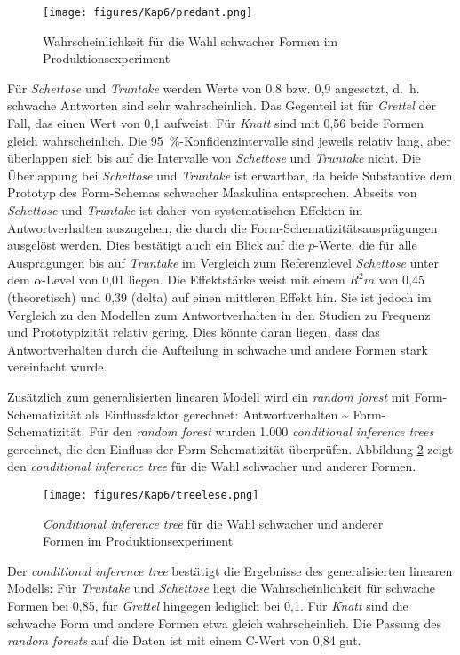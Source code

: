 \begin{figure}
\texttt{[image: figures/Kap6/predant.png]} 
\caption{Wahrscheinlichkeit für die Wahl schwacher Formen im Produktionsexperiment}
\label{predantles}
\end{figure}

Für \textit{Schettose} und \textit{Truntake} werden Werte von 0,8 bzw. 0,9 angesetzt, d.~h. schwache Antworten sind sehr wahrscheinlich. Das Gegenteil ist für \textit{Grettel} der Fall, das einen Wert von 0,1 aufweist. Für \textit{Knatt} sind mit 0,56 beide Formen gleich wahrscheinlich. Die 95~\%-Konfidenzintervalle sind jeweils relativ lang, aber überlappen sich bis auf die Intervalle von \textit{Schettose} und \textit{Truntake} nicht. Die Überlappung bei \textit{Schettose} und \textit{Truntake} ist erwartbar, da beide Substantive dem Prototyp des Form-Schemas schwacher Maskulina entsprechen. Abseits von \textit{Schettose} und \textit{Truntake} ist daher von systematischen Effekten im Antwortverhalten auszugehen, die durch die Form-Schematizitätsausprägungen ausgelöst werden. Dies bestätigt auch ein Blick auf die $p$-Werte, die für alle Ausprägungen bis auf \textit{Truntake} im Vergleich zum Referenzlevel \textit{Schettose} unter dem $\alpha$-Level von 0,01 liegen. Die Effektstärke weist mit einem $R^2m$ von 0,45 (theoretisch) und 0,39 (delta) auf einen mittleren Effekt hin. Sie ist jedoch im Vergleich zu den Modellen zum Antwortverhalten in den Studien zu Frequenz und Prototypizität relativ gering. Dies könnte daran liegen, dass das Antwortverhalten durch die Aufteilung in schwache und andere Formen stark vereinfacht wurde.

Zusätzlich zum generalisierten linearen Modell wird ein \textit{random forest} mit Form-Schemati\-zi\-tät als Einflussfaktor gerechnet: Antwortverhalten \~{} Form-Sche\-ma\-ti\-zi\-tät. Für den \textit{random forest} wurden 1.000 \textit{conditional inference trees} gerechnet, die den Einfluss der Form-Schematizität überprüfen. Abbildung \ref{treeles} zeigt den \textit{conditional inference tree} für die Wahl schwacher und anderer Formen. 

\begin{figure}
\texttt{[image: figures/Kap6/treelese.png]} 
\caption{\textit{Conditional inference tree} für die Wahl schwacher und anderer Formen im Produktionsexperiment}
\label{treeles}
\end{figure}

Der \textit{conditional inference tree} bestätigt die Ergebnisse des generalisierten linearen Modells: Für \textit{Truntake} und \textit{Schettose} liegt die Wahrscheinlichkeit für schwache Formen bei 0,85, für \textit{Grettel} hingegen lediglich bei 0,1. Für \textit{Knatt} sind die schwache Form und andere Formen etwa gleich wahrscheinlich. Die Passung des \textit{random forests} auf die Daten ist mit einem C-Wert von 0,84 gut. 

